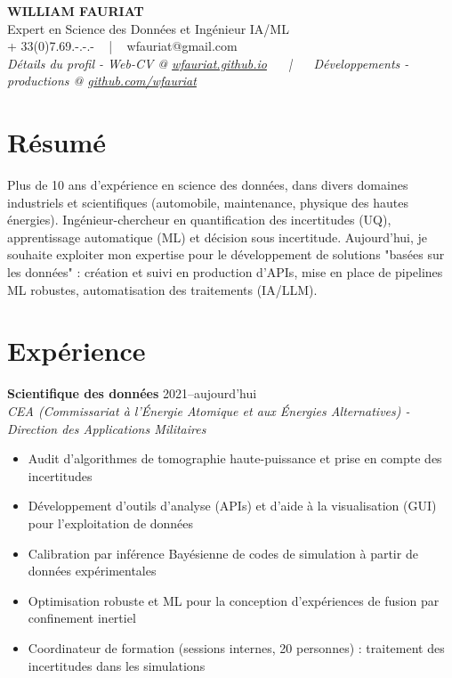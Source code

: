 \documentclass[10pt,a4paper]{article}
\newcommand{\resumeitem}[1]{\item\small{#1}}
\newcommand{\experience}[4]{
  \textbf{#1} \hfill \textcolor{mediumgray}{#2}\\
  \textit{\color{mediumgray}#3}%
  #4
  \vspace{1mm}
}
\begin{document}
\begin{center}
  {\LARGE\bfseries\color{accentcolor} WILLIAM FAURIAT}\\[1mm]
  {\large Expert en Science des Données et Ingénieur IA/ML} 
  \\[1mm]
  \normalsize + 33(0)7.69.-.-.- ~ | ~ wfauriat@gmail.com \\[0.5mm] 
  \textit{
  Détails du profil - Web-CV @ \href{https://wfauriat.github.io}{wfauriat.github.io} ~~ | ~~
  Développements - productions @ \href{https://github.com/wfauriat}{github.com/wfauriat}}
\end{center}

\vspace{0.2mm}

\section*{Résumé}
\small
Plus de 10 ans d'expérience en science des données, dans divers domaines industriels et scientifiques 
(automobile, maintenance, physique des hautes énergies). 
Ingénieur-chercheur en quantification des incertitudes (UQ), 
apprentissage automatique (ML) et décision sous incertitude. 
Aujourd'hui, je souhaite exploiter mon expertise pour le développement de solutions "basées sur les données" :
création et suivi en production d'APIs,
mise en place de pipelines ML robustes,
 automatisation des traitements (IA/LLM).

\section*{Expérience}

\experience{Scientifique des données}{2021--aujourd'hui}{CEA (Commissariat à l’Énergie Atomique et aux Énergies Alternatives) - Direction des Applications Militaires}{
\begin{itemize}
  \resumeitem{Audit d'algorithmes de tomographie haute-puissance et prise en compte des incertitudes}
  \resumeitem{Développement d'outils d'analyse (APIs) et d'aide à la visualisation (GUI) pour l'exploitation de données}
  \resumeitem{Calibration par inférence Bayésienne de codes de simulation à partir de données expérimentales} 	 
  \resumeitem{Optimisation robuste et ML pour la conception d'expériences de fusion par confinement inertiel}
  \resumeitem{Coordinateur de formation (sessions internes, 20 personnes) : traitement des incertitudes dans les simulations}
\end{itemize}
}
\end{document}
